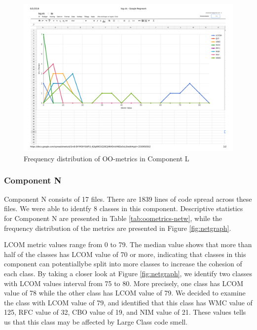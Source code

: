 \begin{landscape}
\setlength\LTleft{-.5in}
	\begin{figure}
	\centering
	\includegraphics[width=\textwidth]{images/pdf/log.pdf}
	\caption{Frequency distribution of OO-metrics in Component L}
	\label{fig:loggraph}
	\end{figure}
\end{landscape}




\subsubsection{Component N}
Component N consists of 17 files. There are 1839 lines of code spread across these files. We were able to identfy 8 classes in this component. Descriptive statistics for Component N are presented in Table \ref{tab:oometrics-netw}, while the frequency distribution of the metrics are presented in Figure \ref{fig:netgraph}.

LCOM metric values range from 0 to 79. The median value shows that more than half of the classes has LCOM value of 70 or more, indicating that classes in this component can potentiallybe split into more classes to increase the cohesion of each class. By taking a closer look at Figure \ref{fig:netgraph}, we identify two classes with LCOM values interval from 75 to 80. More precisely, one class has LCOM value of 78 while the other class has LCOM value of 79. We decided to examine the class with LCOM value of 79, and identified that this class has WMC value of 125, RFC value of 32, CBO value of 19, and NIM value of 21. These values tells us that this class may be affected by Large Class code smell.


